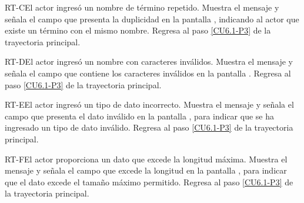 	\begin{UCtrayectoriaA}{RT-C}{El actor ingresó un nombre de término repetido.}
		\UCpaso[\UCsist] Muestra el mensaje  y señala el campo que presenta la duplicidad en la pantalla , indicando al actor que existe un término con el mismo nombre.
		\UCpaso Regresa al paso \ref{CU6.1-P3} de la trayectoria principal.
	\end{UCtrayectoriaA}

	\begin{UCtrayectoriaA}{RT-D}{El actor ingresó un nombre con caracteres inválidos.}
	\UCpaso[\UCsist] Muestra el mensaje  y señala el campo que contiene los caracteres inválidos en la pantalla .
	\UCpaso Regresa al paso \ref{CU6.1-P3} de la trayectoria principal.
	\end{UCtrayectoriaA}

	\begin{UCtrayectoriaA}{RT-E}{El actor ingresó un tipo de dato incorrecto.}
	\UCpaso[\UCsist] Muestra el mensaje  y señala el campo que presenta el dato inválido en la pantalla , para indicar que se ha ingresado un tipo de dato inválido.
	\UCpaso Regresa al paso \ref{CU6.1-P3} de la trayectoria principal.
	\end{UCtrayectoriaA}


	\begin{UCtrayectoriaA}{RT-F}{El actor proporciona un dato que excede la longitud máxima.}
		\UCpaso[\UCsist] Muestra el mensaje  y señala el campo que excede la longitud en la pantalla , para indicar que el dato excede el tamaño máximo permitido.
		\UCpaso Regresa al paso \ref{CU6.1-P3} de la trayectoria principal.
	\end{UCtrayectoriaA}
